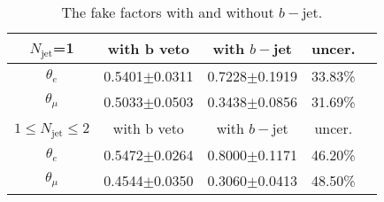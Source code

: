 \begin{table}[h]
\begin{center}
\begin{tabular}{c|cccc}
\hline
\hline
$N_{\text{jet}}$=1 &with b veto &with $b-$jet  &uncer.  \\
\hline
$\theta_{e}$ &0.5401$\pm$0.0311    &0.7228$\pm$0.1919 &33.83\% \\
$\theta_{\mu}$ &0.5033$\pm$0.0503   &0.3438$\pm$0.0856 &31.69\% \\
\hline
\hline
$1\leq N_{\text{jet}} \leq$2 &with b veto &with $b-$jet  &uncer.  \\
\hline
$\theta_{e}$  &0.5472$\pm$0.0264   &0.8000$\pm$0.1171  &46.20\%  \\
$\theta_{\mu}$  &0.4544$\pm$0.0350  &0.3060$\pm$0.0413 &48.50\%  \\
\hline
\hline
\end{tabular}
\caption{The fake factors with and without $b-$jet.}
\label{tab:ff_syst_sample_composition}
\end{center}
\end{table}
